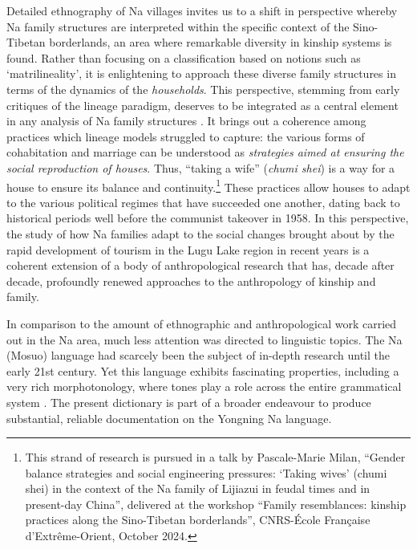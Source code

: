 Detailed ethnography of Na villages \parencite{milan_na_2016,milan_tourisme_2019} invites us to a shift in perspective whereby Na family structures are interpreted within the specific context of the Sino-Tibetan borderlands, an area where remarkable diversity in kinship systems is found. Rather than focusing on a classification based on notions such as ‘matrilineality’, it is enlightening to approach these diverse family structures in terms of the dynamics of the \emph{households}. This perspective, stemming from early critiques of the lineage paradigm, deserves to be integrated as a central element in any analysis of Na family structures \parencite{zhou_zigong_2003,hosana_2006}. It brings out a coherence among practices which lineage models struggled to capture: the various forms of cohabitation and marriage can be understood as \emph{strategies aimed at ensuring the social reproduction of houses}. Thus, “taking a wife” (\emph{chumi shei}) is a way for a house to ensure its balance and continuity.\footnote{This strand of research is pursued in a talk by Pascale-Marie Milan, “Gender balance strategies and social engineering pressures: ‘Taking wives' (chumi shei) in the context of the Na family of Lijiazui in feudal times and in present-day China”, delivered at the workshop “Family resemblances: kinship practices along the Sino-Tibetan borderlands”, CNRS-École Française d'Extrême-Orient, October 2024.} These practices allow houses to adapt to the various political regimes that have succeeded one another, dating back to historical periods well before the communist takeover in 1958. In this perspective, the study of how Na families adapt to the social changes brought about by the rapid development of tourism in the Lugu Lake region in recent years \parencite{walsh_living_2001,mattison2010,milan_tourisme_2019} is a coherent extension of a body of anthropological research that has, decade after decade, profoundly renewed approaches to the anthropology of kinship and family.

In comparison to the amount of ethnographic and anthropological work carried out in the Na area, much less attention was directed to linguistic topics. The Na (Mosuo) language had scarcely been the subject of in-depth research until the early 21st century. Yet this language exhibits fascinating properties, including a very rich morphotonology, where tones play a role across the entire grammatical system \parencite{michaud2017}. The present dictionary is part of a broader endeavour to produce substantial, reliable documentation on the Yongning Na language.

